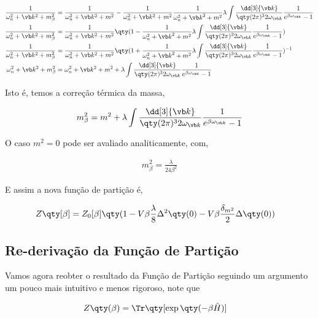 \documentclass[twoside]{amsart}
\numberwithin{equation}{section}
\begin{document}
\begin{refsection}
\begin{align}
    \frac{1}{\omega_{n}^2+\vb k^2+m_\beta^2}&=\frac{1}{\omega_n^2+\vb k^2+m^2}-\frac{1}{\omega_{n}^2+\vb k^2+m^2}\frac{1}{\omega_{n}^2+{{\vb k}}^2+m^2}\lambda\int\frac{\dd[3]{\vb k}}{\qty(2\pi)^32\omega_{\vb k}}\frac{1}{e^{\beta\omega_{\vb k}}-1}\\
    \frac{1}{\omega_{n}^2+\vb k^2+m_\beta^2}&=\frac{1}{\omega_n^2+\vb k^2+m^2}\qty(1-\frac{1}{\omega_{n}^2+{{\vb k}}^2+m^2}\lambda\int\frac{\dd[3]{\vb k}}{\qty(2\pi)^32\omega_{\vb k}}\frac{1}{e^{\beta\omega_{\vb k}}-1})\\
    \frac{1}{\omega_{n}^2+\vb k^2+m_\beta^2}&=\frac{1}{\omega_n^2+\vb k^2+m^2}\qty(1+\frac{1}{\omega_{n}^2+{{\vb k}}^2+m^2}\lambda\int\frac{\dd[3]{\vb k}}{\qty(2\pi)^32\omega_{\vb k}}\frac{1}{e^{\beta\omega_{\vb k}}-1})^{-1}\\
    \omega_n^2+\vb k^2+m_\beta^2&=\omega_n^2+\vb k^2+m^2+\lambda\int\frac{\dd[3]{\vb k}}{\qty(2\pi)^32\omega_{\vb k}}\frac{1}{e^{\beta\omega_{\vb k}}-1}
\end{align} 

Isto é, temos a correção térmica da massa,

\begin{align}
    m_\beta^2=m^2+\lambda\int\frac{\dd[3]{\vb k}}{\qty(2\pi)^32\omega_{\vb k}}\frac{1}{e^{\beta\omega_{\vb k}}-1}
\end{align}

O caso $m^2=0$ pode ser avaliado analiticamente, com,

\begin{align}
    m_\beta^2=\frac{\lambda}{24\beta^2}
\end{align}

E assim a nova função de partição é,

\begin{align}
    Z\qty[\beta]&=Z_0[\beta]\qty(1-V\beta\frac{\lambda}{8}\Delta^2\qty(0)-V\beta\frac{\delta_{m^2}}{2}\Delta\qty(0))  
\end{align}

\subsection{Re-derivação da Função de Partição}

Vamos agora reobter o resultado da Função de Partição seguindo um argumento um pouco mais intuitivo e menos rigoroso, 
note que

\begin{align}
    Z\qty(\beta)&=\Tr\qty[\exp\qty(-\beta\hat H)]
\end{align}


\end{refsection}
\end{document}
